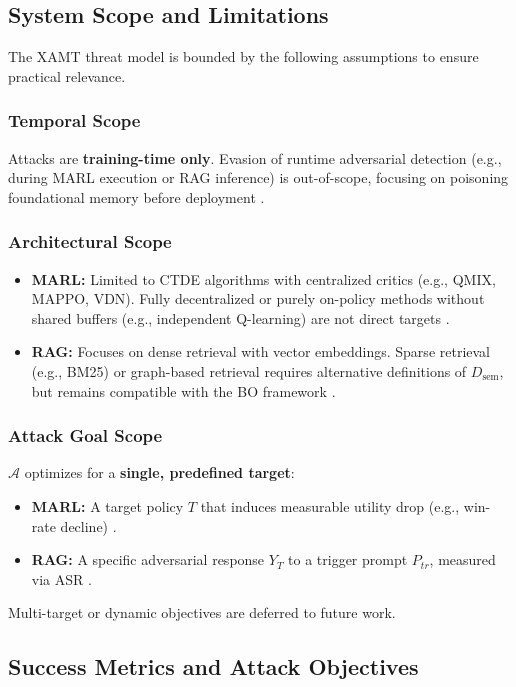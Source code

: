 \documentclass[conference]{IEEEtran}
\begin{document}
\subsection{System Scope and Limitations}
The XAMT threat model is bounded by the following assumptions to ensure practical relevance.

\subsubsection{Temporal Scope}
Attacks are \textbf{training-time only}. Evasion of runtime adversarial detection (e.g., during MARL execution or RAG inference) is out-of-scope, focusing on poisoning foundational memory before deployment \cite{Ref13, Ref25}.

\subsubsection{Architectural Scope}
\begin{itemize}
\item \textbf{MARL:} Limited to CTDE algorithms with centralized critics (e.g., QMIX, MAPPO, VDN). Fully decentralized or purely on-policy methods without shared buffers (e.g., independent Q-learning) are not direct targets \cite{Ref6, Ref10}.
\item \textbf{RAG:} Focuses on dense retrieval with vector embeddings. Sparse retrieval (e.g., BM25) or graph-based retrieval requires alternative definitions of $D_{\text{sem}}$, but remains compatible with the BO framework \cite{Ref42, Ref48}.
\end{itemize}

\subsubsection{Attack Goal Scope}
$\mathcal{A}$ optimizes for a \textbf{single, predefined target}:

\begin{itemize}
\item \textbf{MARL:} A target policy $T$ that induces measurable utility drop (e.g., win-rate decline) \cite{Ref36, Ref41}.
\item \textbf{RAG:} A specific adversarial response $Y_T$ to a trigger prompt $P_{tr}$, measured via ASR \cite{Ref7, Ref37}.
\end{itemize}

Multi-target or dynamic objectives are deferred to future work.

\subsection{Success Metrics and Attack Objectives}
\end{document}
